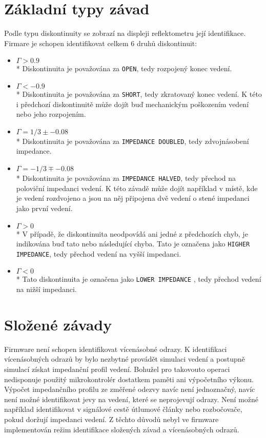 \section{Základní typy závad}
Podle typu diskontinuity se zobrazí na displeji reflektometru její identifikace. Firmare je schopen identifikovat celkem 6 druhů diskontinuit:
\begin{itemize}
	\item{$\Gamma>\SI{0.9}{}$}\\* Diskontinuita je považována za \verb|OPEN|, tedy rozpojený konec vedení.
	\item{$\Gamma<\SI{-0.9}{}$}\\* Diskontinuita je považována za \verb|SHORT|, tedy zkratovaný konec vedení. K této i předchozí diskontinuitě může dojít buď mechanickým poškozením vedení nebo jeho rozpojením.
	\item{$\Gamma=1/3 \pm \SI{-0.08}{}$}\\* Diskontinuita je považována za \verb|IMPEDANCE DOUBLED|, tedy zdvojnásobení impedance.
	\item{$\Gamma=-1/3 \mp \SI{-0.08}{}$}\\* Diskontinuita je považována za \verb|IMPEDANCE HALVED|, tedy přechod na poloviční impedanci vedení. K této závadě může dojít například v místě, kde je vedení rozdvojeno a jsou na něj připojena dvě vedení o stené impedanci jako první vedení.
	\item{$\Gamma>\SI{0}{}$}\\* V případě, že diskontinuita neodpovídá ani jedné z předchozích chyb, je indikována buď tato nebo následující chyba. Tato je označena jako \verb|HIGHER IMPEDANCE|, tedy přechod vedení na vyšší impedanci.
	\item{$\Gamma<\SI{0}{}$}\\* Tato diskontinuita je označena jako \verb|LOWER IMPEDANCE| , tedy přechod vedení na nižší impedanci.
\end{itemize}

\section{Složené závady}
Firmware není schopen identifikovat vícenásobné odrazy. K identifikaci vícenásobných odrazů by bylo nezbytné provádět simulaci vedení a postupně simulací získat impedanční profil vedení. Bohužel pro takovouto operaci nedisponuje použitý mikrokontrolér dostatkem paměti ani výpočetního výkonu. Výpočet impedančního profilu ze změřené odezvy navíc není jednoznačný, navíc není možné identifikovat jevy na vedení, které se neprojevují odrazy. Není možné například identifikovat v signálové cestě útlumové články nebo rozbočovače, pokud doržují impedanci vedení. Z těchto důvodů nebyl ve firmware implementován režim identifikace složených závad a vícenásobných odrazů.
